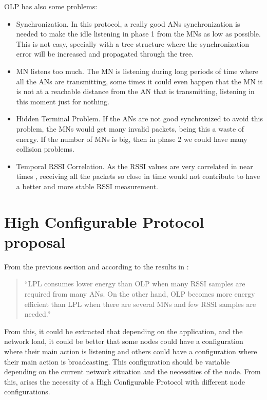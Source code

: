 \ac{OLP} has also some problems:

\begin{itemize}
 \item Synchronization. In this protocol, a really good \acp{AN} synchronization is needed to make the idle listening in phase 1 from the 
\acp{MN} as low as possible. This is not easy, specially with a tree structure where the synchronization error will be increased and 
propagated through the tree.
 \item \ac{MN} listens too much. The \ac{MN} is listening during long periods of time where all the \acp{AN} are transmitting, some times it
could even happen that the \ac{MN} it is not at a reachable distance from the \ac{AN} that is transmitting, listening in this moment just 
for nothing.
 \item Hidden Terminal Problem. If the \acp{AN} are not good synchronized to avoid this problem, the \acp{MN} would get many invalid 
packets, being this a waste of energy. If the number of \acp{MN} is big, then in phase 2 we could have many collision problems.
 \item Temporal \ac{RSSI} Correlation. As the \ac{RSSI} values are very correlated in near times \cite{RSSIcorrelated}, receiving all 
the packets so close in time would not contribute to have a better and more stable \ac{RSSI} measurement.
\end{itemize}
 

\section{High Configurable Protocol proposal}
\label{sec:ProtocolDescription}

From the previous section and according to the results in \cite{LPLandOLP}:
\begin{quote}
``LPL consumes lower energy than OLP when many RSSI samples are required from many ANs. On the other hand,
OLP becomes more energy efficient than LPL when there are several MNs and few RSSI samples are needed.''\cite{LPLandOLP}
\end{quote}

From this, it could be extracted that depending on the application, and the network load, it could be better that some nodes could have a 
configuration where their main action is listening and others could have a configuration where their main action is broadcasting. This 
configuration should be variable depending on the current network situation and the necessities of the node. From this, arises the necessity
of a High Configurable Protocol with different node configurations.

